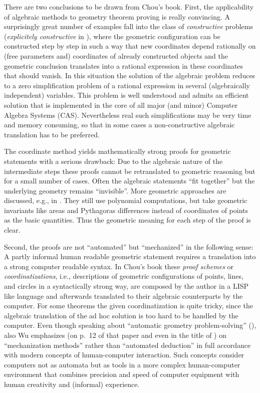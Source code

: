 \documentclass[11pt]{article}
\begin{document}
There are two conclusions to be drawn from Chou's book. First, the
applicability of algebraic methods to geometry theorem proving is really
convincing. A surprisingly great number of examples fall into the class of
{\em constructive} problems ({\em explicitely constructive} in
\cite{Books/Wu_01a}), where the geometric configuration can be constructed
step by step in such a way that new coordinates depend rationally on (free
parameters and) coordinates of already constructed objects and the geometric
conclusion translates into a rational expression in these coordinates that
should vanish. In this situation the solution of the algebraic problem reduces
to a zero simplification problem of a rational expression in several
(algebraically independent) variables.  This problem is well understood and
admits an efficient solution that is implemented in the core of all major (and
minor) Computer Algebra Systems (CAS).  Nevertheless real such simplifications
may be very time and memory consuming, so that in some cases a
non-constructive algebraic translation has to be preferred.

The coordinate method yields mathematically strong proofs for geometric
statements with a serious drawback: Due to the algebraic nature of the
intermediate steps these proofs cannot be retranslated to geometric reasoning
but for a small number of cases.  Often the algebraic statements ``fit
together'' but the underlying geometry remains ``invisible''.  More geometric
approaches are discussed, e.g., in \cite{Books/Chou_94a}. They still use
polynomial computations, but take geometric invariants like areas and
Pythagoras differences instead of coordinates of points as the basic
quantities. Thus the geometric meaning for each step of the proof is clear.

Second, the proofs are not ``automated'' but ``mechanized'' in the following
sense: A partly informal human readable geometric statement requires a
translation into a strong computer readable syntax.  In Chou's book
\cite{Books/Chou_88a} these {\em proof schemes} or {\em coordinatizations},
i.e., descriptions of geometric configurations of points, lines, and circles
in a syntactically strong way, are composed by the author in a LISP like
language and afterwards translated to their algebraic counterparts by the
computer.  For some theorems the given coordinatization is quite tricky, since
the algebraic translation of the ad hoc solution is too hard to be handled by
the computer.  Even though speaking about ``automatic geometry
problem-solving'' (\cite{Wu_99a}), also Wu emphasizes (on p.~12 of that paper
and even in the title of \cite{Books/Wu_94a}) on ``mechanization methods''
rather than ``automated deduction'' in full accordance with modern concepts of
human-computer interaction. Such concepts consider computers not as automata
but as tools in a more complex human-computer environment that combines
precision and speed of computer equipment with human creativity and (informal)
experience.
 
\end{document}
